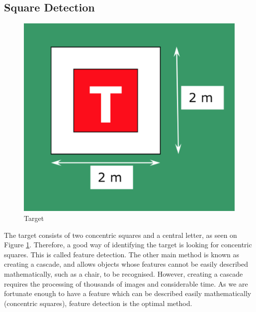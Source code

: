 \documentclass[11pt]{article}
\begin{document}
\subsection{Square Detection}
\begin{figure}
    \begin{center}
        \includegraphics[width=0.48\linewidth]{IMechE_target}
        \caption{Target}
        \label{fig:target}
    \end{center}
\end{figure}

The target consists of two concentric squares and a central letter, as seen on Figure \ref{fig:target}\cite{IMechE_rules}. Therefore, a good way of identifying the target is looking for concentric squares. This is called feature detection. The other main method is known as creating a cascade, and allows objects whose features cannot be easily described mathematically, such as a chair, to be recognised. However, creating a cascade requires the processing of thousands of images and considerable time. As we are fortunate enough to have a feature which can be described easily mathematically (concentric squares), feature detection is the optimal method.
\end{document}
